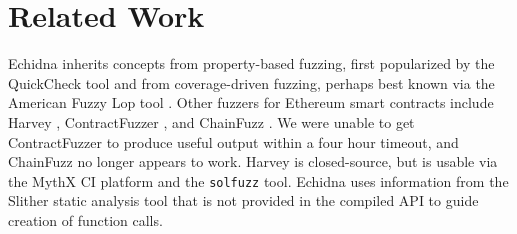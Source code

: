 \section{Related Work}

Echidna inherits concepts from property-based fuzzing, first popularized by the QuickCheck tool \cite{ClaessenH00} and from coverage-driven fuzzing, perhaps best known via the American Fuzzy Lop tool \cite{aflfuzz}.  Other fuzzers for Ethereum smart contracts include Harvey \cite{harvey}, ContractFuzzer \cite{contractfuzzer}, and ChainFuzz \cite{chainfuzz}.  We were unable to get ContractFuzzer to produce useful output within a four hour timeout, and ChainFuzz no longer appears to work.  Harvey is closed-source, but is usable via the MythX \cite{mythx} CI platform and the {\tt solfuzz} \cite{solfuzz} tool.  Echidna uses information from the Slither static analysis tool \cite{slitherpaper} that is not provided in the compiled API to guide creation of function calls.